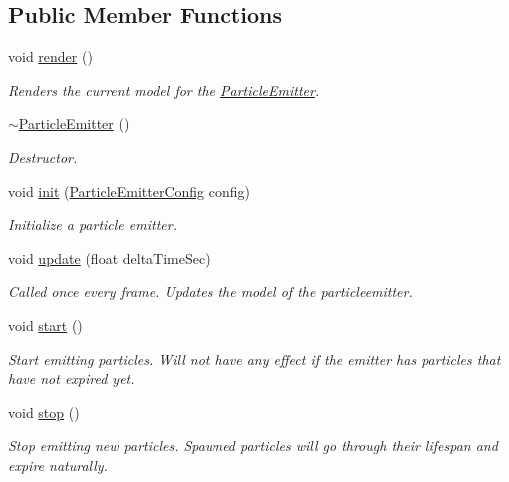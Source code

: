 \subsection*{Public Member Functions}
\begin{DoxyCompactItemize}
\item 
void \hyperlink{class_mason_1_1_particle_emitter_aa3b6ee77d7b15e2064003d8f75d53774}{render} ()
\begin{DoxyCompactList}\small\item\em Renders the current model for the \hyperlink{class_mason_1_1_particle_emitter}{Particle\+Emitter}. \end{DoxyCompactList}\item 
\hyperlink{class_mason_1_1_particle_emitter_a6f4952f7555ede99d74d42b30c80f3e2}{$\sim$\+Particle\+Emitter} ()
\begin{DoxyCompactList}\small\item\em Destructor. \end{DoxyCompactList}\item 
void \hyperlink{class_mason_1_1_particle_emitter_a31dbabbe960449bcc71ac94f0421a07f}{init} (\hyperlink{struct_mason_1_1_particle_emitter_config}{Particle\+Emitter\+Config} config)
\begin{DoxyCompactList}\small\item\em Initialize a particle emitter. \end{DoxyCompactList}\item 
void \hyperlink{class_mason_1_1_particle_emitter_a34da56b84fe4810c701f4b1541e079dc}{update} (float delta\+Time\+Sec)
\begin{DoxyCompactList}\small\item\em Called once every frame. Updates the model of the particleemitter. \end{DoxyCompactList}\item 
void \hyperlink{class_mason_1_1_particle_emitter_aba4bcba68194e57b715779426ce68a19}{start} ()
\begin{DoxyCompactList}\small\item\em Start emitting particles. Will not have any effect if the emitter has particles that have not expired yet. \end{DoxyCompactList}\item 
void \hyperlink{class_mason_1_1_particle_emitter_a4843aa3afd1c4d49c9c2519837fffe81}{stop} ()
\begin{DoxyCompactList}\small\item\em Stop emitting new particles. Spawned particles will go through their lifespan and expire naturally. \end{DoxyCompactList}\end{DoxyCompactItemize}
